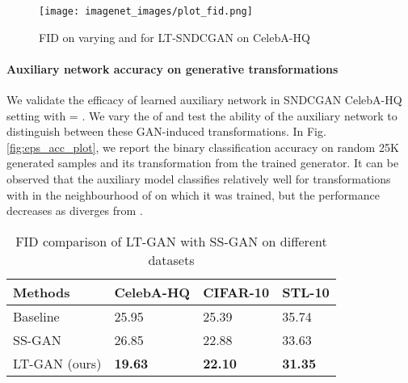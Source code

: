 \documentclass[10pt,twocolumn,letterpaper]{article}
\begin{document}
\begin{figure}[t]
\centering
    \texttt{[image: imagenet\_images/plot\_fid.png]}
    \caption{\footnotesize{FID on varying  and  for LT-SNDCGAN on CelebA-HQ}}
    \label{fig:ablation_hp}
\end{figure}

\vspace{-8pt}

\paragraph{Auxiliary network accuracy on generative transformations}
We validate the efficacy of learned auxiliary network  in SNDCGAN CelebA-HQ setting with  = . We vary the  of  and test the ability of the auxiliary network to distinguish between these GAN-induced transformations. In Fig. \ref{fig:eps_acc_plot}, we report the binary classification accuracy on random 25K generated samples and its transformation from the trained generator. It can be observed that the auxiliary model classifies relatively well for transformations with  in the neighbourhood of  on which it was trained, but the performance decreases as  diverges from .









\begin{table}[t]
\centering
\begin{tabular}{|l|l|l|l|}
\hline
 Methods  &    CelebA-HQ  & CIFAR-10  &  STL-10 \\ \hline
Baseline &    25.95     & 25.39     &   35.74    \\  
SS-GAN   &   26.85      & 22.88     &   33.63    \\ 
LT-GAN (ours)   &   \textbf{19.63}      &  \textbf{22.10}   &    \textbf{31.35}   \\ \hline

\end{tabular}
\caption{\footnotesize{FID comparison of LT-GAN with SS-GAN on different datasets}}
\label{tab:ssgan}
\end{table}

\vspace{-14pt}
\end{document}
